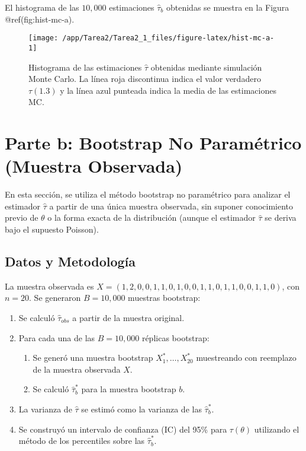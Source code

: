 \documentclass[
  11pt,
  a4paper]{article}
\begin{document}
El histograma de las \(10,000\) estimaciones \(\hat{\tau}_b\) obtenidas
se muestra en la Figura @ref(fig:hist-mc-a).

\begin{figure}

{\centering \texttt{[image: /app/Tarea2/Tarea2\_1\_files/figure-latex/hist-mc-a-1]} 

}

\caption{Histograma de las estimaciones $\hat{\tau}$ obtenidas mediante simulación Monte Carlo. La línea roja discontinua indica el valor verdadero $\tau(1.3)$ y la línea azul punteada indica la media de las estimaciones MC.}\label{fig:hist-mc-a}
\end{figure}

\section{Parte b: Bootstrap No Paramétrico (Muestra Observada)}

En esta sección, se utiliza el método bootstrap no paramétrico para
analizar el estimador \(\hat{\tau}\) a partir de una única muestra
observada, sin suponer conocimiento previo de \(\theta\) o la forma
exacta de la distribución (aunque el estimador \(\hat{\tau}\) se deriva
bajo el supuesto Poisson).

\subsection{Datos y Metodología}

La muestra observada es
\(X = (1, 2, 0, 0, 1, 1, 0, 1, 0, 0, 1, 1, 0, 1, 1, 0, 0, 1, 1, 0)\),
con \(n=20\). Se generaron \(B=10,000\) muestras bootstrap:

\begin{enumerate}
    \item Se calculó $\hat{\tau}_{obs}$ a partir de la muestra original.
    \item Para cada una de las $B=10,000$ réplicas bootstrap:
    \begin{enumerate}
        \item Se generó una muestra bootstrap $X_1^*, \dots, X_{20}^*$ muestreando con reemplazo de la muestra observada $X$.
        \item Se calculó $\hat{\tau}_b^*$ para la muestra bootstrap $b$.
    \end{enumerate}
    \item La varianza de $\hat{\tau}$ se estimó como la varianza de las $\hat{\tau}_b^*$.
    \item Se construyó un intervalo de confianza (IC) del 95\% para $\tau(\theta)$ utilizando el método de los percentiles sobre las $\hat{\tau}_b^*$.
\end{enumerate}
\end{document}

